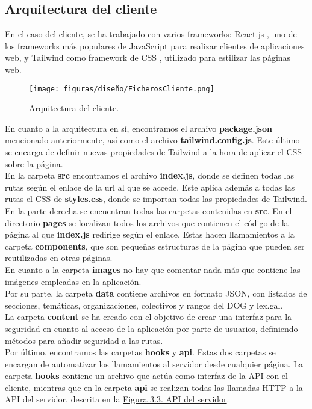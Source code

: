 \subsection{Arquitectura del cliente}

En el caso del cliente, se ha trabajado con varios frameworks: React.js \cite{react}, uno de los frameworks más populares de JavaScript para realizar clientes de aplicaciones web, y Tailwind \cite{tailwind} como framework de CSS \cite{css}, utilizado para estilizar las páginas web.
\\

\begin{figure}[H]
\centerline{\texttt{[image: figuras/diseño/FicherosCliente.png]}}
\caption{Arquitectura del cliente.}
\label{enlaceArquitecturaCliente}
\end{figure}

En cuanto a la arquitectura en sí, encontramos el archivo {\bf package.json} mencionado anteriormente, así como el archivo {\bf tailwind.config.js}. Este último se encarga de definir nuevas propiedades de Tailwind a la hora de aplicar el CSS sobre la página.
\\

En la carpeta {\bf src} encontramos el archivo {\bf index.js}, donde se definen todas las rutas según el enlace de la url al que se accede. Este aplica además a todas las rutas el CSS de {\bf styles.css}, donde se importan todas las propiedades de Tailwind.
\\

En la parte derecha se encuentran todas las carpetas contenidas en {\bf src}. En el directorio {\bf pages} se localizan todos los archivos que contienen el código de la página al que {\bf index.js} redirige según el enlace. Estas hacen llamamientos a la carpeta {\bf components}, que son pequeñas estructuras de la página que pueden ser reutilizadas en otras páginas.
\\

En cuanto a la carpeta {\bf images} no hay que comentar nada más que contiene las imágenes empleadas en la aplicación.
\\

Por su parte, la carpeta {\bf data} contiene archivos en formato JSON, con listados de secciones, temáticas, organizaciones, colectivos y rangos del DOG y lex.gal.
\\

La carpeta {\bf content} se ha creado con el objetivo de crear una interfaz para la seguridad en cuanto al acceso de la aplicación por parte de usuarios, definiendo métodos para añadir seguridad a las rutas.
\\

Por último, encontramos las carpetas {\bf hooks} y {\bf api}. Estas dos carpetas se encargan de automatizar los llamamientos al servidor desde cualquier página. La carpeta {\bf hooks} contiene un archivo que actúa como interfaz de la API con el cliente, mientras que en la carpeta {\bf api} se realizan todas las llamadas HTTP a la API del servidor, descrita en la \hyperref[enlaceAPIServidor]{Figura 3.3. API del servidor}.